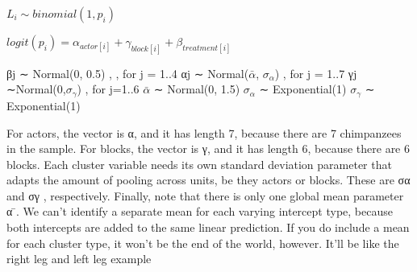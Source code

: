 \documentclass[
]{article}
\begin{document}
\(L_i \sim binomial(1,p_i)\)

\(logit(p_i)= \alpha_{actor[i]} + \gamma_{block[i]} + \beta_{treatment[i]}\)

βj ∼ Normal(0, 0.5) , , for j = 1..4 αj ∼ Normal(\(\bar{\alpha}\),
\(\sigma_{\alpha}\)) , for j = 1..7 γj ∼Normal(0,\(\sigma_{\gamma}\)) ,
for j=1..6 \(\bar{\alpha}\) ∼ Normal(0, 1.5) \(\sigma_{\alpha}\) ∼
Exponential(1) \(\sigma_{\gamma}\) ∼ Exponential(1)

For actors, the vector is α, and it has length 7, because there are 7
chimpanzees in the sample. For blocks, the vector is γ, and it has
length 6, because there are 6 blocks. Each cluster variable needs its
own standard deviation parameter that adapts the amount of pooling
across units, be they actors or blocks. These are σα and σγ ,
respectively. Finally, note that there is only one global mean parameter
α ̄. We can't identify a separate mean for each varying intercept type,
because both intercepts are added to the same linear prediction. If you
do include a mean for each cluster type, it won't be the end of the
world, however. It'll be like the right leg and left leg example
\end{document}

